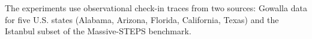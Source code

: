 The experiments use observational check-in traces from two sources: Gowalla data for
five U.S. states (Alabama, Arizona, Florida, California, Texas) and the Istanbul subset of the Massive-STEPS
benchmark. %
